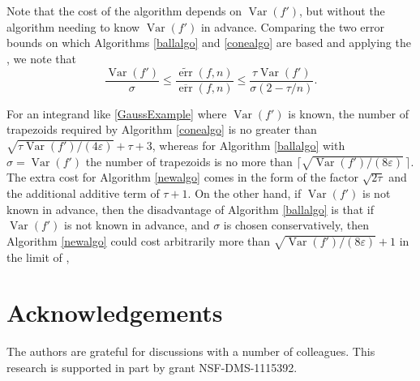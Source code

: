\documentclass[]{article}
\DeclareMathOperator{\Var}{Var}
\DeclareMathOperator{\err}{err}
\newcommand{\oerr}{\overline{\err}}
\newcommand{\terr}{\widetilde{\err}}
\theoremstyle{definition}
\theoremstyle{remark}
\begin{document}
Note that the cost of the algorithm depends on $\Var(f')$, but without the algorithm needing to know $\Var(f')$ in advance.   Comparing the two error bounds on which Algorithms \ref{ballalgo} and \ref{conealgo} are based and applying the , we note that 
\begin{equation*}
\frac{\Var(f')}{\sigma} \le
\frac{\terr(f,n)}{\oerr(f,n)}
\le \frac{\tau\Var(f')}{\sigma (2-\tau/n)}.
\end{equation*}



For an integrand like \eqref{GaussExample} where $\Var(f')$ is known, the number of trapezoids required by Algorithm \ref{conealgo} is no greater than  $\sqrt{\tau \Var(f') /(4\varepsilon)} + \tau + 3$, whereas for Algorithm \ref{ballalgo} with $\sigma=\Var(f')$ the number of trapezoids is no more than $\bigl \lceil \sqrt{\Var(f') /(8\varepsilon)} \, \bigr\rceil$.  The extra cost for Algorithm \ref{newalgo} comes in the form of the factor $\sqrt{2\tau}$ and the additional additive term of $\tau+1$.  On the other hand, if $\Var(f')$ is not known in advance, then the disadvantage of Algorithm  \ref{ballalgo} is that if $\Var(f')$ is not known in advance, and $\sigma$ is chosen conservatively, then Algorithm \ref{newalgo} could cost arbitrarily more than $\sqrt{\Var(f') /(8\varepsilon)}+1$ in the limit of , 

\section{Acknowledgements}  The authors are grateful for discussions with a number of colleagues. This research is supported in part by grant NSF-DMS-1115392.


\end{document}
